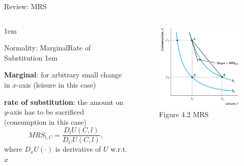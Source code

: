 \documentclass[11pt,aspectratio=43]{beamer}
\let\olditemize=\itemize
\let\endolditemize=\enditemize
\renewenvironment{itemize}{\olditemize \itemsep1em}{\endolditemize}
\theoremstyle{definition}
\begin{document}
\begin{frame}{Review: MRS}
\label{slide:Review__MRS}
    \begin{columns}
        \begin{column}{0.5\textwidth}
            \begin{itemize}
                \item \alert{Normality}: M{\tiny arginal}R{\tiny ate of }S{\tiny ubstitution}
                \begin{itemize}
                    \item \textbf{Marginal}: for \alert{arbitrary small} change in $ x $-axis (leisure in this case)
                    \item \textbf{rate of substitution}: the amount on $ y $-axis has to be sacrificed (consumption in this case)
                \end{itemize}
                \begin{equation}
                \label{eq:MRS}
                    MRS_{l, C} = \frac{D_{l} U( C, l )}{D_{C}U( C, l )}
                ,\end{equation}
                where $ D_{x}U( \cdot ) $ is derivative of $ U $ w.r.t. $ x $
            \end{itemize}
        \end{column}
        \begin{column}{0.5\textwidth}
        \begin{figure}
            \caption{Figure 4.2 MRS}
            \includegraphics[width=\textwidth]{./figures/Figure4_2.jpg}
        \end{figure}
        \end{column}
    \end{columns}
\end{frame}
\end{document}
